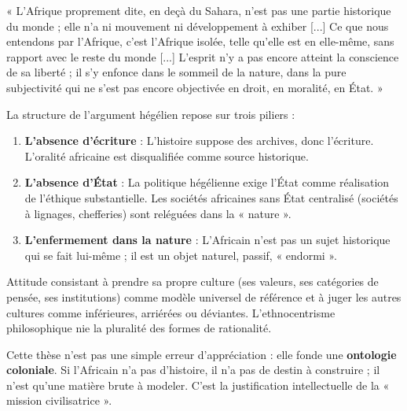 \documentclass[11pt]{article}
\begin{document}
\begin{exemplebox}
« L'Afrique proprement dite, en deçà du Sahara, n'est pas une partie historique du monde ; elle n'a ni mouvement ni développement à exhiber [...] Ce que nous entendons par l'Afrique, c'est l'Afrique isolée, telle qu'elle est en elle-même, sans rapport avec le reste du monde [...] L'esprit n'y a pas encore atteint la conscience de sa liberté ; il s'y enfonce dans le sommeil de la nature, dans la pure subjectivité qui ne s'est pas encore objectivée en droit, en moralité, en État. »
\end{exemplebox}

\noindent La structure de l'argument hégélien repose sur trois piliers :
\begin{enumerate}
    \item \textbf{L'absence d'écriture} : L'histoire suppose des archives, donc l'écriture. L'oralité africaine est disqualifiée comme source historique.
    \item \textbf{L'absence d'État} : La politique hégélienne exige l'État comme réalisation de l'éthique substantielle. Les sociétés africaines sans État centralisé (sociétés à lignages, chefferies) sont reléguées dans la « nature ».
    \item \textbf{L'enfermement dans la nature} : L'Africain n'est pas un sujet historique qui se fait lui-même ; il est un objet naturel, passif, « endormi ».
\end{enumerate}

\begin{definition}[Ethnocentrisme]
Attitude consistant à prendre sa propre culture (ses valeurs, ses catégories de pensée, ses institutions) comme modèle universel de référence et à juger les autres cultures comme inférieures, arriérées ou déviantes. L'ethnocentrisme philosophique nie la pluralité des formes de rationalité.
\end{definition}

\noindent Cette thèse n'est pas une simple erreur d'appréciation : elle fonde une \textbf{ontologie coloniale}. Si l'Africain n'a pas d'histoire, il n'a pas de destin à construire ; il n'est qu'une matière brute à modeler. C'est la justification intellectuelle de la « mission civilisatrice ».
\end{document}
